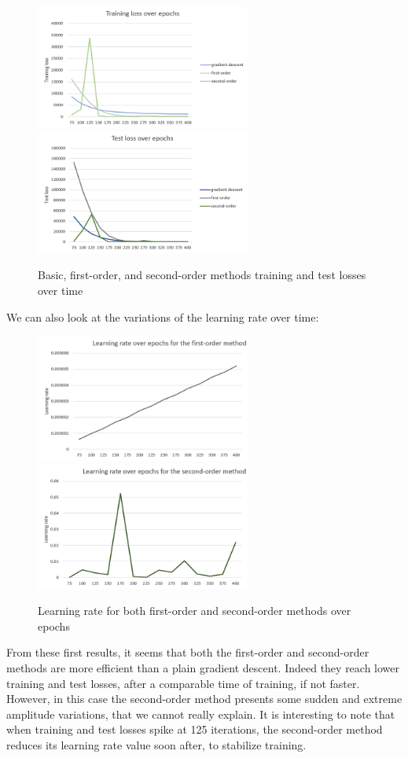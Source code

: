 \documentclass{article}
\begin{document}
  \begin{figure}[!h]
	\includegraphics[width=200pt]{loss_train_linear.png}
	\includegraphics[width=200pt]{loss_test_linear.png}
	\caption{Basic, first-order, and second-order methods training and test losses over time}
  \end{figure}

  We can also look at the variations of the learning rate over time:\\
  
  \begin{figure}[!h]
	\includegraphics[width=200pt]{lr_linear_1st_order.png}
	\includegraphics[width=200pt]{lr_linear_2nd_order.png}
	\caption{Learning rate for both first-order and second-order methods over epochs}
  \end{figure}  
  
  From these first results, it seems that both the first-order and second-order methods are more efficient than a plain gradient descent. Indeed they reach lower training and test losses, after a comparable time of training, if not faster. However, in this case the second-order method presents some sudden and extreme amplitude variations, that we cannot really explain. It is interesting to note that when training and test losses spike at 125 iterations, the second-order method reduces its learning rate value soon after, to stabilize training.
  
\end{document}
